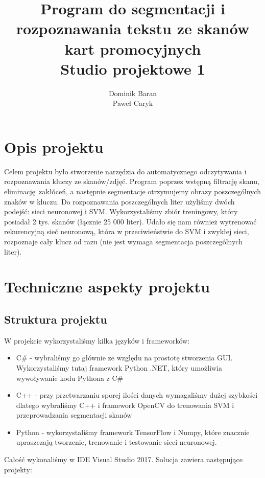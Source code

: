 \documentclass[titlepage,10pt,a4paper]{article}
\author{
	Dominik Baran \\
	Paweł Caryk
}
\title{Program do segmentacji i rozpoznawania tekstu ze skanów kart promocyjnych\\ \large Studio projektowe 1}
\begin{document}
\maketitle

\tableofcontents

\pagebreak
\section{Opis projektu}
Celem projektu było stworzenie narzędzia do automatycznego odczytywania i rozpoznawania kluczy ze skanów/zdjęć. Program poprzez wstępną filtrację skanu, eliminację zakłóceń, a następnie segmentacje otrzymujemy obrazy poszczególnych znaków w kluczu. Do rozpoznawania poszczególnych liter użyliśmy dwóch podejść: sieci neuronowej i SVM. Wykorzystaliśmy zbiór treningowy, który posiadał 2 tys. skanów (łącznie 25 000 liter). Udało się nam również wytrenować rekurencyjną sieć neuronową, która w przeciwieństwie do SVM i zwykłej sieci, rozpoznaje cały klucz od razu (nie jest wymaga segmentacja poszczególnych liter).

\section{Techniczne aspekty projektu}

\subsection{Struktura projektu}
W projekcie wykorzystaliśmy kilka języków i frameworków:
\begin{itemize}
	\item C\# - wybraliśmy go głównie ze względu na prostotę stworzenia GUI. Wykorzystaliśmy tutaj framework Python .NET, który umożliwia wywoływanie kodu Pythona z C\#
	\item C++ - przy przetwarzaniu sporej ilości danych wymagaliśmy dużej szybkości dlatego wybraliśmy C++ i framework OpenCV do trenowania SVM i przeprowadzania segmentacji skanów
	\item Python - wykorzystaliśmy framework TensorFlow i Numpy, które znacznie upraszczają tworzenie, trenowanie i testowanie sieci neuronowej.
\end{itemize}
Całość wykonaliśmy w IDE Visual Studio 2017. Solucja zawiera następujące projekty:
\end{document}
